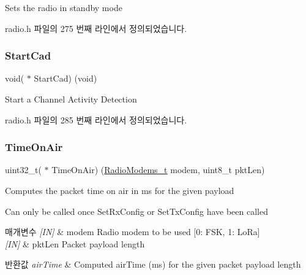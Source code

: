 Sets the radio in standby mode 



radio.\+h 파일의 275 번째 라인에서 정의되었습니다.

\mbox{\label{struct_radio__s_a6896222d46a4b809dde1e916ee6d5d6b}} 
\subsubsection{\texorpdfstring{Start\+Cad}{StartCad}}
{\footnotesize\ttfamily void( $\ast$ Start\+Cad) (void)}



Start a Channel Activity Detection 



radio.\+h 파일의 285 번째 라인에서 정의되었습니다.

\mbox{\label{struct_radio__s_a030d3e891a70725d55e6e547e00f9278}} 
\subsubsection{\texorpdfstring{Time\+On\+Air}{TimeOnAir}}
{\footnotesize\ttfamily uint32\+\_\+t( $\ast$ Time\+On\+Air) (\mbox{\hyperlink{radio_8h_a992ef7a5b7f52975ba7bd8dd97740057}{Radio\+Modems\+\_\+t}} modem, uint8\+\_\+t pkt\+Len)}



Computes the packet time on air in ms for the given payload 

Can only be called once Set\+Rx\+Config or Set\+Tx\+Config have been called


\begin{DoxyParams}{매개변수}
{\em \mbox{[}\+I\+N\mbox{]}} & modem Radio modem to be used \mbox{[}0\+: F\+SK, 1\+: Lo\+Ra\mbox{]} \\
\hline
{\em \mbox{[}\+I\+N\mbox{]}} & pkt\+Len Packet payload length\\
\hline
\end{DoxyParams}

\begin{DoxyRetVals}{반환값}
{\em air\+Time} & Computed air\+Time (ms) for the given packet payload length \\
\hline
\end{DoxyRetVals}


